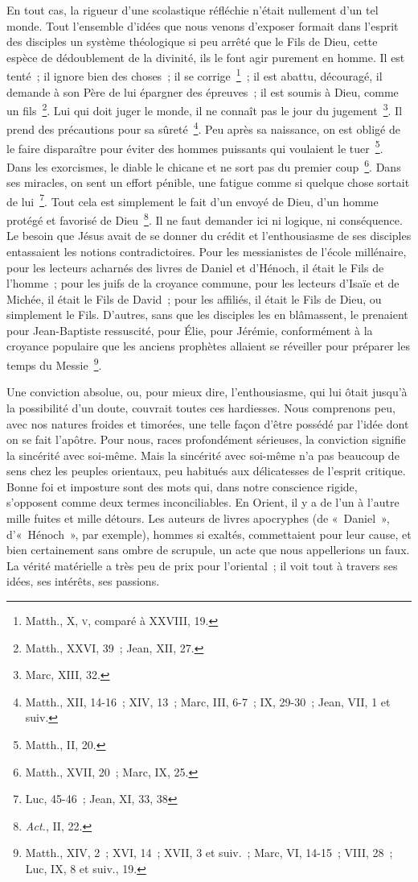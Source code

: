 \documentclass[french,twoside]{book} %
\begin{document}
En tout cas, la rigueur d’une scolastique réfléchie n’était nullement d’un tel monde. Tout l’ensemble d’idées que nous venons d’exposer formait dans l’esprit des disciples un système théologique si peu arrêté que le Fils de Dieu, cette espèce de dédoublement de la divinité, ils le font agir purement en homme. Il est tenté ; il ignore bien des choses ; il se corrige \footnote{ Matth., X, \textsc{v}, comparé à XXVIII, 19.} ; il est abattu, découragé, il demande à son Père de lui épargner des épreuves ; il est soumis à Dieu, comme un fils \footnote{Matth., XXVI, 39 ; Jean, XII, 27.}. Lui qui doit juger le monde, il ne connaît pas le jour du jugement \footnote{Marc, XIII, 32.}. Il prend des précautions pour sa sûreté \footnote{Matth., XII, 14-16 ; XIV, 13 ; Marc, III, 6-7 ; IX, 29-30 ; Jean, VII, 1 et suiv.}. Peu après sa naissance, on est obligé de le faire disparaître pour éviter des hommes puissants qui voulaient le tuer \footnote{Matth., II, 20.}. Dans les exorcismes, le diable le chicane et ne sort pas du premier coup \footnote{Matth., XVII, 20 ; Marc, IX, 25.}. Dans ses miracles, on sent un effort pénible, une fatigue comme si quelque chose sortait de lui \footnote{Luc, 45-46 ; Jean, XI, 33, 38}. Tout cela est simplement le fait d’un envoyé de Dieu, d’un homme protégé et favorisé de Dieu \footnote{{\itshape Act.}, II, 22.}. Il ne faut demander ici ni logique, ni conséquence. Le besoin que Jésus avait de se donner du crédit et l’enthousiasme de ses disciples entassaient les notions contradictoires. Pour les messianistes de l’école millénaire, pour les lecteurs acharnés des livres de Daniel et d’Hénoch, il était le Fils de l’homme ; pour les juifs de la croyance commune, pour les lecteurs d’Isaïe et de Michée, il était le Fils de David ; pour les affiliés, il était le Fils de Dieu, ou simplement le Fils. D’autres, sans que les disciples les en blâmassent, le prenaient pour Jean-Baptiste ressuscité, pour Élie, pour Jérémie, conformément à la croyance populaire que les anciens prophètes allaient se réveiller pour préparer les temps du Messie \footnote{Matth., XIV, 2 ; XVI, 14 ; XVII, 3 et suiv. ; Marc, VI, 14-15 ; VIII, 28 ; Luc, IX, 8 et suiv., 19.}.\par
Une conviction absolue, ou, pour mieux dire, l’enthousiasme, qui lui ôtait jusqu’à la possibilité d’un doute, couvrait toutes ces hardiesses. Nous comprenons peu, avec nos natures froides et timorées, une telle façon d’être possédé par l’idée dont on se fait l’apôtre. Pour nous, races profondément sérieuses, la conviction signifie la sincérité avec soi-même. Mais la sincérité avec soi-même n’a pas beaucoup de sens chez les peuples orientaux, peu habitués aux délicatesses de l’esprit critique. Bonne foi et imposture sont des mots qui, dans notre conscience rigide, s’opposent comme deux termes inconciliables. En Orient, il y a de l’un à l’autre mille fuites et mille détours. Les auteurs de livres apocryphes (de « Daniel », d’« Hénoch », par exemple), hommes si exaltés, commettaient pour leur cause, et bien certainement sans ombre de scrupule, un acte que nous appellerions un faux. La vérité matérielle a très peu de prix pour l’oriental ; il voit tout à travers ses idées, ses intérêts, ses passions.\par
\end{document}
